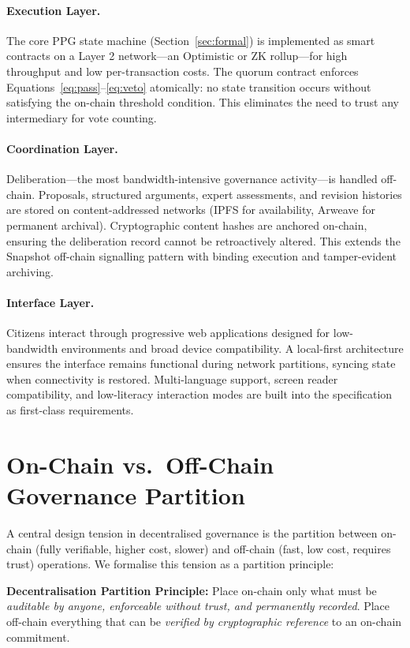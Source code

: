 \documentclass[12pt,a4paper,oneside]{report}
\begin{document}
\paragraph{Execution Layer.} The core PPG state machine (Section~\ref{sec:formal}) is implemented as smart contracts on a Layer 2 network---an Optimistic or ZK rollup---for high throughput and low per-transaction costs. The quorum contract enforces Equations~\ref{eq:pass}--\ref{eq:veto} atomically: no state transition occurs without satisfying the on-chain threshold condition. This eliminates the need to trust any intermediary for vote counting.

\paragraph{Coordination Layer.} Deliberation---the most bandwidth-intensive governance activity---is handled off-chain. Proposals, structured arguments, expert assessments, and revision histories are stored on content-addressed networks (IPFS for availability, Arweave for permanent archival). Cryptographic content hashes are anchored on-chain, ensuring the deliberation record cannot be retroactively altered. This extends the Snapshot off-chain signalling pattern with binding execution and tamper-evident archiving.

\paragraph{Interface Layer.} Citizens interact through progressive web applications designed for low-bandwidth environments and broad device compatibility. A local-first architecture ensures the interface remains functional during network partitions, syncing state when connectivity is restored. Multi-language support, screen reader compatibility, and low-literacy interaction modes are built into the specification as first-class requirements.

\section{On-Chain vs.\ Off-Chain Governance Partition}

A central design tension in decentralised governance is the partition between on-chain (fully verifiable, higher cost, slower) and off-chain (fast, low cost, requires trust) operations. We formalise this tension as a partition principle:

\begin{mdframed}
\textbf{Decentralisation Partition Principle:} Place on-chain only what must be \emph{auditable by anyone, enforceable without trust, and permanently recorded}. Place off-chain everything that can be \emph{verified by cryptographic reference} to an on-chain commitment.
\end{mdframed}
\end{document}
